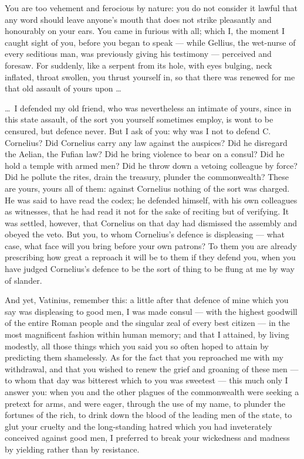  You are too vehement and ferocious by nature: you do not consider it lawful that any word should leave anyone's mouth that does not strike pleasantly and honourably on your ears. You came in furious with all; which I, the moment I caught sight of you, before you began to speak --- while Gellius, the wet-nurse of every seditious man, was previously giving his testimony --- perceived and foresaw. For suddenly, like a serpent from its hole, with eyes bulging, neck inflated, throat swollen, you thrust yourself in, so that there was renewed for me that old assault of yours upon \dots\

 \dots\ I defended my old friend, who was nevertheless an intimate of yours, since in this state assault, of the sort you yourself sometimes employ, is wont to be censured, but defence never. But I ask of you: why was I not to defend C. Cornelius? Did Cornelius carry any law against the auspices? Did he disregard the Aelian, the Fufian law? Did he bring violence to bear on a consul? Did he hold a temple with armed men? Did he throw down a vetoing colleague by force? Did he pollute the rites, drain the treasury, plunder the commonwealth? These are yours, yours all of them: against Cornelius nothing of the sort was charged. He was said to have read the codex; he defended himself, with his own colleagues as witnesses, that he had read it not for the sake of reciting but of verifying. It was settled, however, that Cornelius on that day had dismissed the assembly and obeyed the veto. But you, to whom Cornelius's defence is displeasing --- what case, what face will you bring before your own patrons? To them you are already prescribing how great a reproach it will be to them if they defend you, when you have judged Cornelius's defence to be the sort of thing to be flung at me by way of slander.

 And yet, Vatinius, remember this: a little after that defence of mine which you say was displeasing to good men, I was made consul --- with the highest goodwill of the entire Roman people and the singular zeal of every best citizen --- in the most magnificent fashion within human memory; and that I attained, by living modestly, all those things which you said you so often hoped to attain by predicting them shamelessly. As for the fact that you reproached me with my withdrawal, and that you wished to renew the grief and groaning of these men --- to whom that day was bitterest which to you was sweetest --- this much only I answer you: when you and the other plagues of the commonwealth were seeking a pretext for arms, and were eager, through the use of my name, to plunder the fortunes of the rich, to drink down the blood of the leading men of the state, to glut your cruelty and the long-standing hatred which you had inveterately conceived against good men, I preferred to break your wickedness and madness by yielding rather than by resistance.

